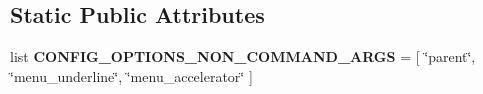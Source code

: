\subsection*{Static Public Attributes}
\begin{DoxyCompactItemize}
\item 
list {\bfseries C\+O\+N\+F\+I\+G\+\_\+\+O\+P\+T\+I\+O\+N\+S\+\_\+\+N\+O\+N\+\_\+\+C\+O\+M\+M\+A\+N\+D\+\_\+\+A\+R\+GS} = \mbox{[} \char`\"{}parent\char`\"{}, \char`\"{}menu\+\_\+underline\char`\"{}, \char`\"{}menu\+\_\+accelerator\char`\"{} \mbox{]}\hypertarget{classpgmenubuilder_1_1PGMenuBuilder_a859d28ed6ef28dca7cb795ef333c12a0}{}\label{classpgmenubuilder_1_1PGMenuBuilder_a859d28ed6ef28dca7cb795ef333c12a0}

\end{DoxyCompactItemize}


